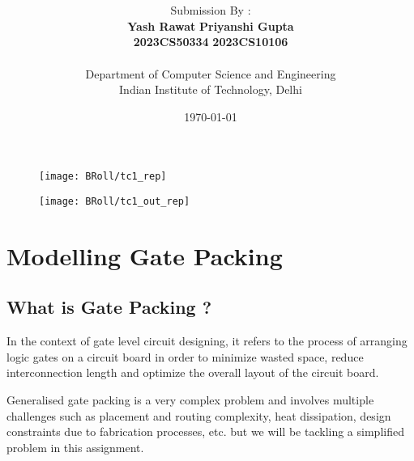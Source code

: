\documentclass[12pt, a4paper,openany]{article}
\title{\vspace{-3cm} \makebox[\textwidth][c]{COL215 SW Assignment 1 - Gate Packing}}
\author{Submission By :\\ \hspace{0.5cm} \textbf{Yash Rawat} \hspace{1cm} \textbf{Priyanshi Gupta}\\ \textbf{2023CS50334} \hspace{1.3cm} \textbf{2023CS10106} \\ \\ Department of Computer Science and Engineering \\ Indian Institute of Technology, Delhi}
\date{\today}
\begin{document}
 
\lstset{style=mystyle}


\maketitle

\begin{figure}[ht]
\centering
  \texttt{[image: BRoll/tc1\_rep]}
  \label{fig:basys_b}
\end{figure}
\begin{figure}[ht]
  \centering
  \texttt{[image: BRoll/tc1\_out\_rep]}
  \label{fig:broll_mux}
\end{figure}

\newpage %

\section{Modelling Gate Packing}
\subsection{What is Gate Packing ?}
\begin{flushleft}
In the context of gate level circuit designing, it refers to the process of arranging logic gates on a circuit board in order to minimize wasted space, reduce interconnection length and optimize the overall layout of the circuit board.
\end{flushleft}
\begin{flushleft}
Generalised gate packing is a very complex problem and involves multiple challenges such as placement and routing complexity, heat dissipation, design constraints due to fabrication processes, etc. but we will be tackling a simplified problem in this assignment.
\end{flushleft}
\end{document}
